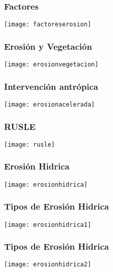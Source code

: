 \documentclass{beamer}
\begin{document}
\begin{frame}
\frametitle{Factores}
\begin{center}
\texttt{[image: factoreserosion]}
\end{center}
\end{frame}
\begin{frame}
\frametitle{Erosión y Vegetación}
\begin{center}
\texttt{[image: erosionvegetacion]}
\end{center}
\end{frame}
\begin{frame}
\frametitle{Intervención antrópica}
\begin{center}
\texttt{[image: erosionacelerada]}
\end{center}
\end{frame}
\begin{frame}
\frametitle{RUSLE}
\begin{center}
\texttt{[image: rusle]}
\end{center}
\end{frame}
\begin{frame}
\frametitle{Erosión Hidrica}
\begin{center}
\texttt{[image: erosionhidrica]}
\end{center}
\end{frame}
\begin{frame}
\frametitle{Tipos de Erosión Hidrica}
\begin{center}
\texttt{[image: erosionhidrica1]}
\end{center}
\end{frame}
\begin{frame}
\frametitle{Tipos de Erosión Hidrica}
\begin{center}
\texttt{[image: erosionhidrica2]}
\end{center}
\end{frame}
\end{document}
